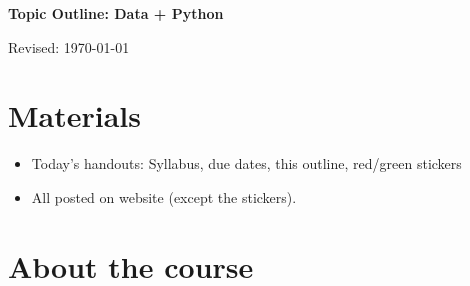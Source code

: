 


\pagestyle{headandfoot}
\runningheadrule
\firstpageheadrule
{}
\runningheader{}{}{}
\runningfooter{}{}{}


\bigskip
\centerline{\Large \bf Topic Outline:  Data + Python}
\medskip
\centerline{Revised: \today}


\section*{Materials}

\begin{itemize}
\item  Today's handouts:  Syllabus, due dates, this outline, red/green stickers
\item  All posted on website (except the stickers).
\end{itemize}

\section*{About the course}

